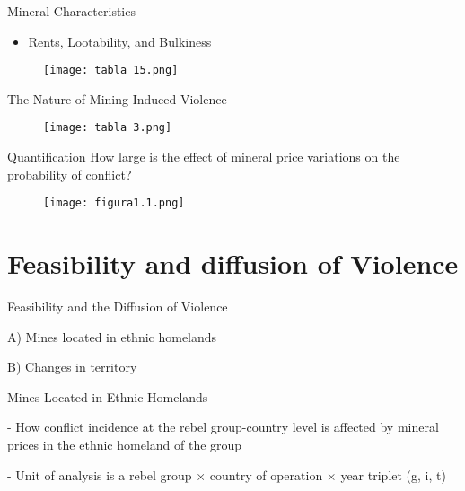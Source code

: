\documentclass[pdftex,12pt,xcolor=pdftex,table]{beamer}
\theoremstyle{definition}
\theoremstyle{remark}
\numberwithin{equation}{section}
\numberwithin{figure}{section}
\begin{document}
         \begin{frame}{Mineral Characteristics}
        \justifying
        \begin{itemize}
        \item Rents, Lootability, and Bulkiness
        \end{itemize}
        \begin{figure}[H]
				\centering
				\texttt{[image: tabla 15.png]}
				
			\end{figure}
    
         \end{frame}
         
         \begin{frame}{The Nature of Mining-Induced Violence}
        \justifying
        
        \begin{figure}[H]
				\centering
				\texttt{[image: tabla 3.png]}
				
			\end{figure}
    
         \end{frame}

    \begin{frame}{Quantification}
        \justifying
        How large is the effect of mineral price variations on the  probability of conflict?  
        \begin{figure}[H]
				\centering
				\texttt{[image: figura1.1.png]}
			
				
			\end{figure}
    
         \end{frame}
	
	\section{Feasibility and diffusion of Violence}
		\begin{frame}{Feasibility and the Diffusion of Violence}
			\justifying
\item A) Mines located in ethnic homelands
\item B) Changes in territory
		\end{frame}
		
	
		\begin{frame}{Mines Located in Ethnic Homelands}
			\justifying
\item - How conflict incidence at the rebel group-country level is affected by mineral prices in the ethnic homeland of the group 
\item - Unit of analysis is a rebel group × country of operation × year triplet (g, i, t)
        \end{frame}
\end{document}
